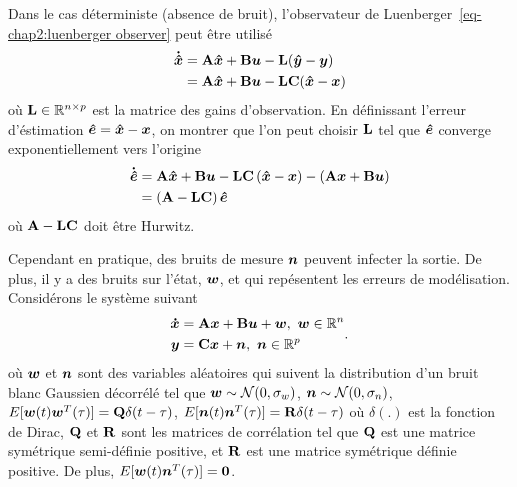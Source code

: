 Dans le cas déterministe (absence de bruit), l'observateur de Luenberger~\eqref{eq-chap2:luenberger observer} peut être utilisé
\begin{align}\label{eq-chap2:luenberger observer}
	\begin{split}
		\bm{\dot{\hat{x}}} &= \mathbf{A}\bm{\hat{x}}+\mathbf{B}\bm{u}-\mathbf{L}(\bm{\hat{y}}-\bm{y})\\
		 &=\mathbf{A}\bm{\hat{x}}+\mathbf{B}\bm{u}-\mathbf{L}\mathbf{C}(\bm{\hat{x}}-\bm{x})
	\end{split}
\end{align}
où $\mathbf{L}\in \mathbb{R}^{n\times p}$ est la matrice des gains d'observation.
En définissant l'erreur d'éstimation $\bm{\hat{e}}=\bm{\hat{x}}-\bm{x}$, on montrer que l'on peut choisir  $\mathbf{L}$ tel que $\bm{\hat{e}}$ converge exponentiellement vers l'origine 
\begin{align}
	\begin{split}
		\bm{\dot{\hat{e}}} &=  \mathbf{A}\bm{\hat{x}}+\mathbf{B}\bm{u}-\mathbf{L}\mathbf{C}\left(\bm{\hat{x}}-\bm{x}\right) - \left(\mathbf{A}\bm{x}+\mathbf{B}\bm{u}\right)\\
		&=\left(\mathbf{A}-\mathbf{L}\mathbf{C}\right)\bm{\hat{e}}
	\end{split}
\end{align}
où $\mathbf{A}-\mathbf{L}\mathbf{C}$ doit être Hurwitz.

Cependant en pratique, des bruits de mesure $\bm{n}$ peuvent infecter la sortie. De plus, il y a des bruits  sur l'état, $\bm{w}$,  et  qui repésentent les erreurs de modélisation. Considérons le système suivant
\begin{align}\label{eq-chap2:syslin_commande_noise}
	\begin{split}
		\stateDot &= \matriceA\state+\matriceB\command+\modelNoise, \ \modelNoise\inR^n\\
		\out &= \matriceC\state + \measureNoise, \ \measureNoise\inR^{p}
	\end{split}.
\end{align}
où $\bm{w}$ et $\bm{n}$ sont des variables aléatoires qui suivent la distribution d'un bruit blanc Gaussien décorrélé tel que $\bm{w}\sim{\cal N}(0,\sigma_w)$, $\bm{n}\sim{\cal N}(0,\sigma_n)$, $E[\bm{w}(t)\bm{w}^T(\tau)]=\mathbf{Q}\delta(t-\tau)$, $E[\bm{n}(t)\bm{n}^T(\tau)]=\mathbf{R}\delta(t-\tau)$ où $\delta(.)$ est la fonction de Dirac,  $\mathbf{Q}$ et $\mathbf{R}$ sont les matrices de corrélation tel que $\mathbf{Q}$ est une matrice symétrique semi-définie positive, et $\mathbf{R}$ est une matrice symétrique définie positive. De plus, $E[\bm{w}(t)\bm{n}^T(\tau)]=\mathbf{0}$.


